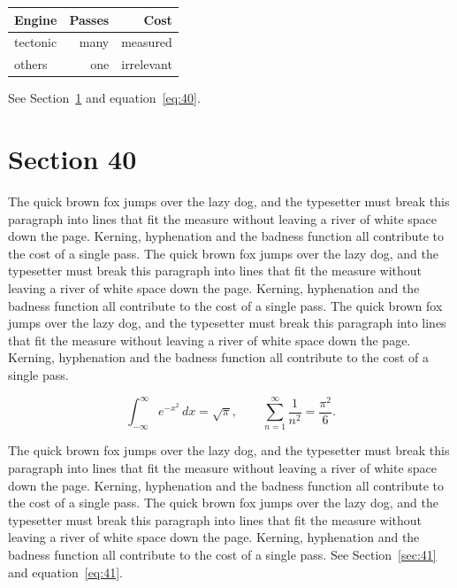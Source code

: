 \documentclass{article}
\begin{document}
\begin{center}
\begin{tabular}{lrr}
\toprule
Engine & Passes & Cost \\
\midrule
tectonic & many & measured \\
others & one & irrelevant \\
\bottomrule
\end{tabular}
\end{center}

See Section~\ref{sec:40} and equation~\eqref{eq:40}.
\section{Section 40}
\label{sec:40}
The quick brown fox jumps over the lazy dog, and the typesetter must break this paragraph into lines that fit the measure without leaving a river of white space down the page. Kerning, hyphenation and the badness function all contribute to the cost of a single pass. The quick brown fox jumps over the lazy dog, and the typesetter must break this paragraph into lines that fit the measure without leaving a river of white space down the page. Kerning, hyphenation and the badness function all contribute to the cost of a single pass. The quick brown fox jumps over the lazy dog, and the typesetter must break this paragraph into lines that fit the measure without leaving a river of white space down the page. Kerning, hyphenation and the badness function all contribute to the cost of a single pass. 

\begin{equation}\label{eq:40}
\int_{-\infty}^{\infty} e^{-x^{2}}\,dx = \sqrt{\pi}, \qquad
\sum_{n=1}^{\infty} \frac{1}{n^{2}} = \frac{\pi^{2}}{6}.
\end{equation}

The quick brown fox jumps over the lazy dog, and the typesetter must break this paragraph into lines that fit the measure without leaving a river of white space down the page. Kerning, hyphenation and the badness function all contribute to the cost of a single pass. The quick brown fox jumps over the lazy dog, and the typesetter must break this paragraph into lines that fit the measure without leaving a river of white space down the page. Kerning, hyphenation and the badness function all contribute to the cost of a single pass. 
See Section~\ref{sec:41} and equation~\eqref{eq:41}.
\end{document}
